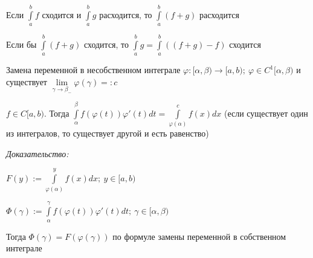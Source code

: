 \documentclass[12pt]{article}
\begin{document}
\begin{Remark}{}
    Если $\int\limits_a^b f$ сходится и $\int\limits_a^b g$ расходится, то $\int\limits_a^b (f + g)$ расходится

    Если бы $\int\limits_a^b (f + g)$ сходится, то $\int\limits_a^b g = \int\limits_a^b ((f + g) - f)$ сходится
\end{Remark}

\begin{theo}{Замена переменной в несобственном интеграле}
    $\varphi : [\alpha, \beta) \to [a, b);\ \varphi \in C^1[\alpha, \beta)$ и существует $\lim\limits_{\gamma \to \beta_-} \varphi(\gamma) =: c$

    $f \in C[a, b)$. Тогда $\int\limits_\alpha^\beta f(\varphi(t)) \varphi'(t)dt = \int\limits_{\varphi(\alpha)}^c f(x)dx$ (если существует один из интегралов, то существует другой и есть равенство)
\end{theo}

\textit{Доказательство:}

$F(y) := \int\limits_{\varphi(\alpha)}^y f(x)dx;\ y \in [a, b)$

$\Phi(\gamma) := \int\limits_\alpha^\gamma f(\varphi(t))\varphi'(t)dt;\ \gamma \in [\alpha, \beta)$

Тогда $\Phi(\gamma) = F(\varphi(\gamma))$ по формуле замены переменной в собственном интеграле
\end{document}
